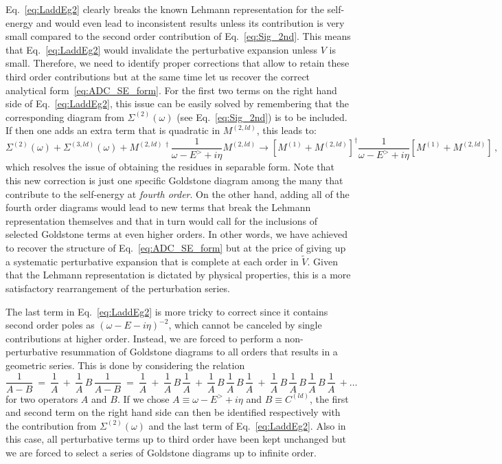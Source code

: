 Eq.~\eqref{eq:LaddEg2}  clearly breaks the known Lehmann representation for the self-energy and would even lead to inconsistent 
results unless its contribution is very small compared to the second order contribution of Eq.~\eqref{eq:Sig_2nd}. This means that Eq.~\eqref{eq:LaddEg2} would
invalidate the perturbative expansion unless $V$ is small.
Therefore, we need to identify proper corrections that allow to retain these third order contributions but at the same time let
us recover the correct analytical form~\eqref{eq:ADC_SE_form}.  For the first two terms on the right hand side of Eq.~\eqref{eq:LaddEg2}, this
issue can be easily solved by remembering that the corresponding diagram from $\Sigma^{(2)}(\omega)$ (see Eq.~\eqref{eq:Sig_2nd}) is to be included.
If then one adds an extra term that is quadratic in  $M^{(2,ld)}$, this leads to:
\begin{equation}
  \Sigma^{(2)}(\omega)  + \Sigma^{(3, ld)}(\omega) + M^{(2,ld) \, \dagger}\frac 1 {\omega  - E^> + i\eta} M^{(2,ld)}
 \longrightarrow  \left[ M^{(1)} +  M^{(2,ld)}\right]^\dagger \frac1{\omega  - E^> + i\eta}\left[ M^{(1)} + M^{(2,ld)}\right]  \, ,
\end{equation}
which resolves the issue of obtaining the residues in separable form. Note that this new correction is just one specific Goldstone diagram among
the many that contribute to the self-energy at {\em fourth order}. On the other hand, adding all of the fourth order diagrams would lead to 
new terms that break the Lehmann representation themselves and that in turn would call for the inclusions of selected Goldstone terms at even higher orders.  In other words, we have achieved to recover the structure of Eq.~\eqref{eq:ADC_SE_form}  but at the price of giving up a systematic 
perturbative expansion that is complete at each order in $\widetilde V$. Given that the Lehmann representation is dictated by physical properties, this is 
a more satisfactory rearrangement of the perturbation series.

The last term in Eq.~\eqref{eq:LaddEg2} is more tricky to correct since it contains second order poles as $(\omega  - E - i\eta)^{-2}$, which cannot be 
canceled by single contributions at higher order. Instead, we are forced to perform a non-perturbative resummation of Goldstone diagrams to all orders that results in a geometric series. This is done by considering the relation
\begin{equation}
 \frac1{A-B}  ~=~  \frac1 A ~+~ \frac1 A  \, B \,  \frac1{A-B}  ~=~  \frac1 A  ~+~  \frac1 A  \, B \,  \frac1 A  ~+~  \frac1 A  \, B \,   \frac1 A   \, B \,   \frac1 A
             ~+~ \frac1 A  \, B \,  \frac1 A  \, B \,  \frac1 A  \, B \,  \frac1 A  ~+ \ldots
  \label{eq:1overAB}
\end{equation}
for two operators $A$ and $B$. If we chose  $A\equiv{\omega  - E^> + i\eta}$ and $B\equiv C^{(ld)}$,  the first and second term on the right hand 
side can then be  identified respectively with the contribution from $\Sigma^{(2)}(\omega)$ and the  last term of Eq.~\eqref{eq:LaddEg2}. 
Also in this case, all perturbative terms up to third order have been kept unchanged  but we are forced to select a series of Goldstone diagrams up to infinite order.   
%

